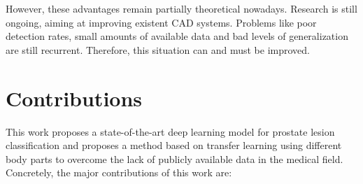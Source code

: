 However, these advantages remain partially theoretical nowadays. Research is still ongoing, aiming at improving existent CAD systems. Problems like poor detection rates, small amounts of available data and bad levels of generalization are still recurrent. Therefore, this situation can and must be improved.




\section{Contributions}
\setlength{\marginparwidth}{3cm}\leavevmode {}This work proposes a state-of-the-art deep learning model for prostate lesion classification and proposes a method based on transfer learning using different body parts to overcome the lack of publicly available data in the medical field. Concretely, the major contributions of this work are:
